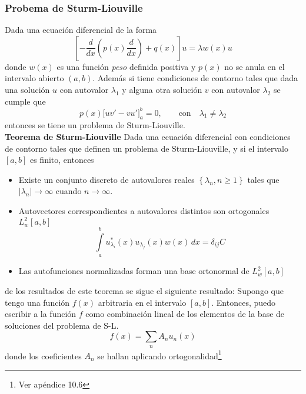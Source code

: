 \subsubsection{Probema de Sturm-Liouville}
Dada una ecuación diferencial de la forma
\begin{equation}
    \left[
        -\frac{d}{dx}
        \left(
            p(x)\frac{d}{dx}
        \right)
        +q(x)
    \right]u
    = \lambda w(x)u
        \label{ec:ProblemaSturmLiouville}
\end{equation}
donde $w(x)$ es una función \textit{peso} definida positiva y $p(x)$ no se anula en el intervalo abierto $(a,b)$. Además si  tiene condiciones de contorno tales que dada una solución $u$ con autovalor $\lambda_{1}$ y alguna otra solución $v$ con autovalor $\lambda_{2}$ se cumple que
\begin{equation*}
    p(x) \Big[ uv' -vu'\Big]_{a}^{b} = 0,
    \quad
    \quad
    \mbox{con}
    \quad 
    \lambda_{1} \neq \lambda_{2}
\end{equation*}
entonces se tiene un problema de Sturm-Liouville.\\
\textbf{Teorema de Sturm-Liouville} Dada una ecuación diferencial con condiciones de contorno tales que definen un problema de Sturm-Liouville, y si el intervalo $[a,b]$ es finito, entonces
\begin{itemize}
    \item Existe un conjunto discreto de autovalores reales $\left\{ \lambda_{n}, n \geq 1 \right\}$ tales que $|\lambda_{n}|\to \infty$ cuando $n\to\infty$.
    \item Autovectores correspondientes a autovalores distintos son ortogonales $L_{w}^{2}[a,b]$
    \begin{equation*}
        \int\limits_{a}^{b}
        u_{\lambda_{i}}^{*}(x)u_{\lambda_{j}}(x)w(x)\,dx = \delta_{ij}C
    \end{equation*}
    \item Las autofunciones normalizadas forman una base ortonormal de $L_{w}^{2}[a,b]$
\end{itemize}
de los resultados de este teorema se sigue el siguiente resultado: Supongo que tengo una función $f(x)$ arbitraria en el intervalo $[a,b]$. Entonces, puedo escribir a la función $f$ como combinación lineal de los elementos de la base de soluciones del problema de S-L.
\begin{equation*}
    f(x) = \sum\limits_{n}A_{n}u_{n}(x)
\end{equation*}
donde los coeficientes $A_{n}$ se hallan aplicando ortogonalidad\footnote{Ver apéndice 10.6}
